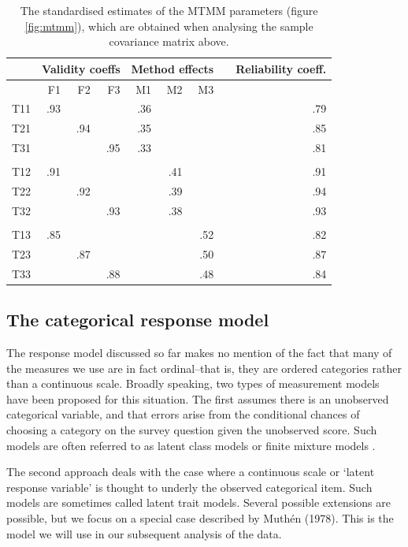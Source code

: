 \documentclass[a4paper,12pt]{article}
\begin{document}
\begin{table}\centering\caption{The standardised estimates of the MTMM parameters (figure \ref{fig:mtmm}), which are obtained when analysing the sample covariance matrix above.\label{tab:mtmm_results}}
\begin{tabular}{lrrrrrrrr}\hline
 &   \multicolumn{3}{c}{Validity coeffs} & \multicolumn{3}{c}{Method effects} &  & Reliability coeff.\\ 
 \hline
    & F1 & F2 & F3 & M1 & M2 & M3 \\ 
T11   & .93 &  &  & .36 &  &  &  & .79 \\ 
T21   &  & .94 &  & .35 &  &  &  & .85 \\ 
T31   &  &  & .95 & .33 &  &  &  & .81 \\ 
 \\ 
T12   & .91 &  &  &  & .41 &  &  & .91 \\ 
T22   &  & .92 &  &  & .39 &  &  & .94     \\ 
T32   &  &  & .93 &  & .38 &  &  & .93 \\ 
 \\ 
T13   & .85 &  &  &  &  & .52 &  & .82 \\ 
T23   &  & .87 &  &  &  & .50 &  & .87\\ 
T33   &  &  & .88 &  &  & .48 &  & .84  \\
\hline
\end{tabular}
\end{table}

\subsection{The categorical response model}

The response model discussed so far makes no mention of the fact that many of the measures we use are in fact ordinal--that is, they are ordered categories rather than a continuous scale. 
Broadly speaking, two types of measurement models have been proposed for this situation. The first assumes there is an unobserved categorical variable, and that errors arise from the conditional chances of choosing a category on the survey question given the unobserved score. Such models are often referred to as latent class models or finite mixture models \cite{lazarsfeld_latent_1968}.

The second approach deals with the case where a continuous scale or `latent response variable' is thought to underly the observed categorical item. Such models are sometimes called latent trait models. Several possible extensions are possible, but we focus on a special case described by Muth\'en (1978). This is the model we will use in our subsequent analysis of the data.
\end{document}
